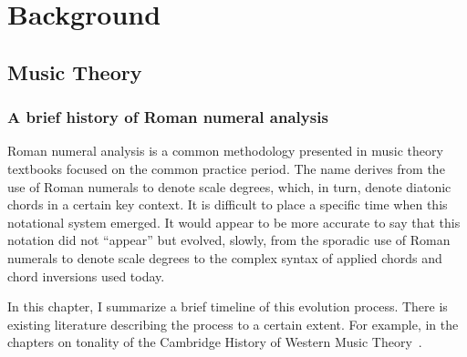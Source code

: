 \chapter{Background}
\label{chap:background}


\section{Music Theory}
\subsection{A brief history of Roman numeral analysis}

Roman numeral analysis is a common methodology presented in music theory textbooks focused on the common practice period.
The name derives from the use of Roman numerals to denote scale degrees, which, in turn, denote diatonic chords in a certain key context.
It is difficult to place a specific time when this notational system emerged.
It would appear to be more accurate to say that this notation did not ``appear'' but evolved, slowly, from the sporadic use of Roman numerals to denote scale degrees to the complex syntax of applied chords and chord inversions used today.

In this chapter, I summarize a brief timeline of this evolution process.
There is existing literature describing the process to a certain extent. 
For example, in the chapters on tonality of the Cambridge History of Western Music Theory~\parencite{christensen_2002}.

